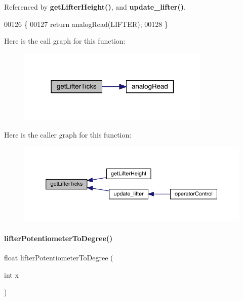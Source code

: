 Referenced by \textbf{ get\+Lifter\+Height()}, and \textbf{ update\+\_\+lifter()}.


\begin{DoxyCode}
00126                      \{
00127   \textcolor{keywordflow}{return} analogRead(LIFTER);
00128 \}
\end{DoxyCode}
Here is the call graph for this function\+:\nopagebreak
\begin{figure}[H]
\begin{center}
\leavevmode
\includegraphics[width=261pt]{lifter_8h_acdf909159b0406c48099843f2306be78_cgraph}
\end{center}
\end{figure}
Here is the caller graph for this function\+:\nopagebreak
\begin{figure}[H]
\begin{center}
\leavevmode
\includegraphics[width=350pt]{lifter_8h_acdf909159b0406c48099843f2306be78_icgraph}
\end{center}
\end{figure}
\mbox{\label{lifter_8h_ab0460888f3213e5510bd25ae1e152a75}} 
\paragraph{lifter\+Potentiometer\+To\+Degree()}
{\footnotesize\ttfamily float lifter\+Potentiometer\+To\+Degree (\begin{DoxyParamCaption}\item[{int}]{x }\end{DoxyParamCaption})}



